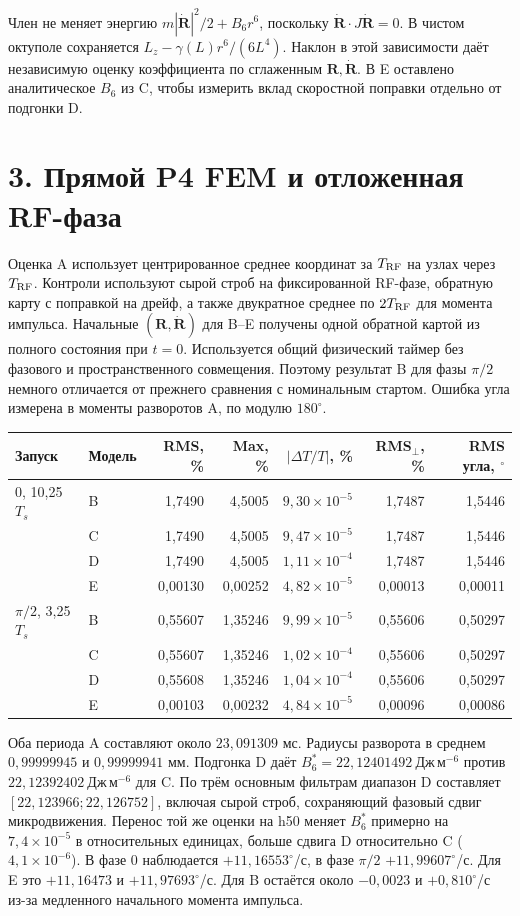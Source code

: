 \documentclass[11pt,a4paper]{article}
\newcommand{\R}{\mathbf R}
\newcommand{\V}{\dot{\mathbf R}}
\newcommand{\e}[1]{\times10^{#1}}
\begin{document}
Член не меняет энергию $m|\V|^2/2+B_6r^6$, поскольку
$\V\cdot J\V=0$. В чистом октуполе сохраняется
$L_z-\gamma(L)r^6/(6L^4)$. Наклон в этой зависимости даёт независимую
оценку коэффициента по сглаженным $\R,\V$. В E оставлено аналитическое
$B_6$ из C, чтобы измерить вклад скоростной поправки отдельно от подгонки D.

\newpage
\section*{3. Прямой P4 FEM и отложенная RF-фаза}
Оценка A использует центрированное среднее координат за $T_{\rm RF}$
на узлах через $T_{\rm RF}$. Контроли используют сырой строб на
фиксированной RF-фазе, обратную карту с поправкой на дрейф, а также
двукратное среднее по $2T_{\rm RF}$ для момента импульса.
Начальные $(\R,\V)$ для B--E получены одной обратной картой из полного
состояния при $t=0$. Используется общий физический таймер без
фазового и пространственного совмещения. Поэтому результат B для
фазы $\pi/2$ немного отличается от прежнего сравнения с номинальным
стартом. Ошибка угла измерена в моменты разворотов A, по модулю $180^\circ$.

\begin{center}
\small
\begin{tabular}{@{}llrrrrr@{}}
\toprule
Запуск & Модель & RMS, \% & Max, \% & $|\Delta T/T|$, \% & RMS$_\perp$, \% & RMS угла, $^\circ$ \\
\midrule
$0$, 10,25 $T_s$ & B & 1,7490 & 4,5005 & $9{,}30\e{-5}$ & 1,7487 & 1,5446 \\
& C & 1,7490 & 4,5005 & $9{,}47\e{-5}$ & 1,7487 & 1,5446 \\
& D & 1,7490 & 4,5005 & $1{,}11\e{-4}$ & 1,7487 & 1,5446 \\
& E & 0,00130 & 0,00252 & $4{,}82\e{-5}$ & 0,00013 & 0,00011 \\
\midrule
$\pi/2$, 3,25 $T_s$ & B & 0,55607 & 1,35246 & $9{,}99\e{-5}$ & 0,55606 & 0,50297 \\
& C & 0,55607 & 1,35246 & $1{,}02\e{-4}$ & 0,55606 & 0,50297 \\
& D & 0,55608 & 1,35246 & $1{,}04\e{-4}$ & 0,55606 & 0,50297 \\
& E & 0,00103 & 0,00232 & $4{,}84\e{-5}$ & 0,00096 & 0,00086 \\
\bottomrule
\end{tabular}
\end{center}

Оба периода A составляют около $23{,}091309$ мс. Радиусы разворота
в среднем $0{,}99999945$ и $0{,}99999941$ мм. Подгонка D даёт
$B_6^\ast=22{,}12401492\ \text{Дж}\,\text{м}^{-6}$ против
$22{,}12392402\ \text{Дж}\,\text{м}^{-6}$ для C. По трём основным фильтрам
диапазон D составляет $[22{,}123966;22{,}126752]$, включая
сырой строб, сохраняющий фазовый сдвиг микродвижения.
Перенос той же оценки на h50 меняет $B_6^\ast$ примерно на $7{,}4\e{-5}$
в относительных единицах, больше сдвига D относительно C ($4{,}1\e{-6}$).
В фазе 0 наблюдается $+11{,}16553^\circ$/с, в фазе $\pi/2$
$+11{,}99607^\circ$/с. Для E это $+11{,}16473$ и $+11{,}97693^\circ$/с.
Для B остаётся около $-0{,}0023$ и $+0{,}810^\circ$/с
из-за медленного начального момента импульса.
\end{document}
